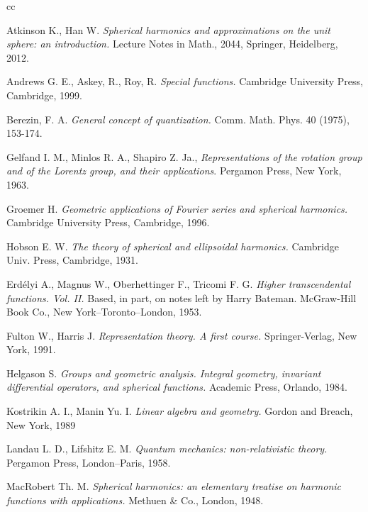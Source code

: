 \documentclass[]{amsart}
\begin{document}
\begin{thebibliography}{cc}

Atkinson K., Han W.
{\it Spherical harmonics and approximations on the unit sphere: an introduction.}
Lecture Notes in Math., 2044,
Springer, Heidelberg, 2012.

Andrews G. E., Askey, R., Roy, R.
{\it Special functions.}
Cambridge University Press, Cambridge, 1999.

Berezin, F. A.
{\it General concept of quantization.}
Comm. Math. Phys. 40 (1975), 153-174.


Gelfand I. M., Minlos R. A., Shapiro Z. Ja.,
{\it Representations of the rotation group and of the Lorentz group, and their applications}.
 Pergamon Press,  New York, 1963.


Groemer H.
{\it Geometric applications of Fourier series and spherical harmonics.}
Cambridge University Press, Cambridge, 1996.

Hobson E. W.
{\it The theory of spherical and ellipsoidal harmonics.}
Cambridge Univ. Press, Cambridge, 1931.

Erd\'elyi A., Magnus W., Oberhettinger F., Tricomi F. G.
{\it Higher transcendental functions. Vol.  II.}
Based, in part, on notes left by Harry Bateman.
McGraw-Hill Book Co., New York--Toronto--London, 1953.

Fulton W., Harris J.
{\it Representation theory.
A first course.}
Springer-Verlag, New York, 1991.

Helgason S.
{\it Groups and geometric analysis.
Integral geometry, invariant differential operators, and spherical functions.}
Academic Press, Orlando,  1984.

Kostrikin A. I., Manin Yu. I.
{\it Linear algebra and geometry.}
Gordon and Breach, New York, 1989

Landau L. D., Lifshitz E. M.
{\it Quantum mechanics: non-relativistic theory.}
Pergamon Press, London--Paris,
 1958.

MacRobert Th. M.
{\it Spherical harmonics: an elementary treatise on harmonic functions with applications.}
 Methuen \& Co., London, 1948.


\end{thebibliography}
\end{document}
